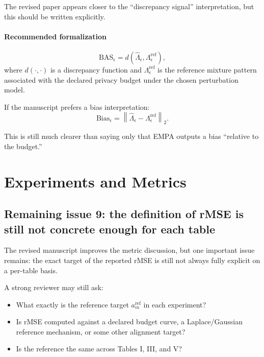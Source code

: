 \documentclass[11pt]{article}
\begin{document}
The revised paper appears closer to the ``discrepancy signal'' interpretation, but this should be written explicitly.

\paragraph{Recommended formalization}
\begin{equation}
\mathrm{BAS}_{\epsilon}
=
d\!\left(
\hat{\Lambda}_{\epsilon},
\Lambda_{\epsilon}^{\mathrm{ref}}
\right),
\label{eq:budget-alignment-score-remaining}
\end{equation}
where \(d(\cdot,\cdot)\) is a discrepancy function and \(\Lambda_{\epsilon}^{\mathrm{ref}}\) is the reference mixture pattern associated with the declared privacy budget under the chosen perturbation model.

If the manuscript prefers a bias interpretation:
\begin{equation}
\mathrm{Bias}_{\epsilon}
=
\left\|
\hat{\Lambda}_{\epsilon}
-
\Lambda_{\epsilon}^{\mathrm{ref}}
\right\|_2.
\label{eq:bias-remaining}
\end{equation}

This is still much clearer than saying only that EMPA outputs a bias ``relative to the budget.''

\section{Experiments and Metrics}

\subsection*{Remaining issue 9: the definition of rMSE is still not concrete enough for each table}
The revised manuscript improves the metric discussion, but one important issue remains: the exact target of the reported rMSE is still not always fully explicit on a per-table basis.

A strong reviewer may still ask:
\begin{itemize}
    \item What exactly is the reference target \(a_m^{\mathrm{ref}}\) in each experiment?
    \item Is rMSE computed against a declared budget curve, a Laplace/Gaussian reference mechanism, or some other alignment target?
    \item Is the reference the same across Tables I, III, and V?
\end{itemize}
\end{document}
